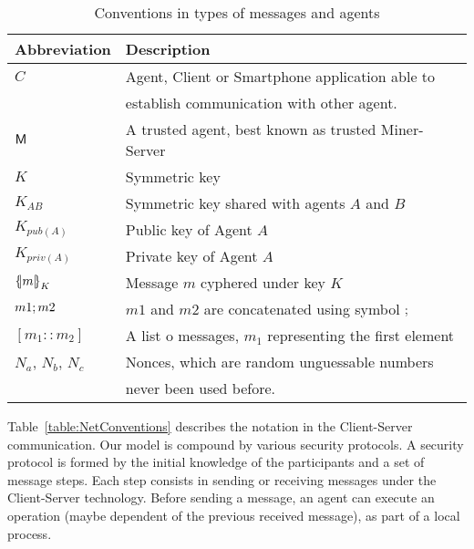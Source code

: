 \begin{table}[htb]
\footnotesize
\begin{center}
\caption{Conventions in types of messages and agents}
\label{table:conventions}
\begin{tabular}{|l|l|}
\hline
{\bf Abbreviation}& {\bf Description}                                   \\\hline\hline
$C$                 &  Agent, Client or Smartphone application able to \\
                    &  establish communication with other agent.         \\ 
$\textsf{M}$           &  A trusted agent, best known as trusted Miner-Server      \\
$K$                 &  Symmetric key                                      \\
$K_{AB}$            &  Symmetric key shared with agents $A$ and $B$       \\
$K_{pub(A)}$        &  Public key of Agent $A$                            \\
$K_{priv(A)}$       &  Private key of Agent $A$                           \\
$\fat{m}_{K}$       &  Message $m$ cyphered under key $K$                 \\
$m1; m2$         &  $m1$ and $m2$ are concatenated using symbol $;$ \\
$[m_1:: m_2]$       &  A list o messages, $m_1$ representing the first element\\
$N_a$, $N_b$, $N_c$ &  Nonces, which are random unguessable numbers      \\
                    &  never been used before.                           \\ \hline \hline
\end{tabular}
\end{center}
\end{table}
\normalsize

Table~\ref{table:NetConventions} describes the notation in the Client-Server communication.
Our model is compound by various security protocols. A security protocol is formed by the 
initial knowledge of the participants and a set of message steps. Each step consists in  
sending or receiving messages under the Client-Server technology. Before sending a message,
an agent can execute an operation (maybe dependent of the previous received message), as part 
of a local process.

